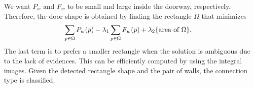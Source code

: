 We want $P_w$ and $F_w$ to be small and large inside the doorway,
respectively. Therefore, the door shape is obtained by finding the
rectangle $\Omega$ that minimizes
\begin{eqnarray}
 \sum_{p\in\Omega} P_w(p)
  - \lambda_1 \sum_{p\in\Omega} F_w(p) + \lambda_2 \{\mbox{area of\
  }\Omega\}.
\end{eqnarray}
The last term is to prefer a smaller rectangle when the solution is
ambiguous due to the lack of evidences. This can be efficiently
computed by using the integral images.
Given the detected rectangle shape and the pair of walls, the connection
type is classified.
%
%
%
%
%
%
%
%
